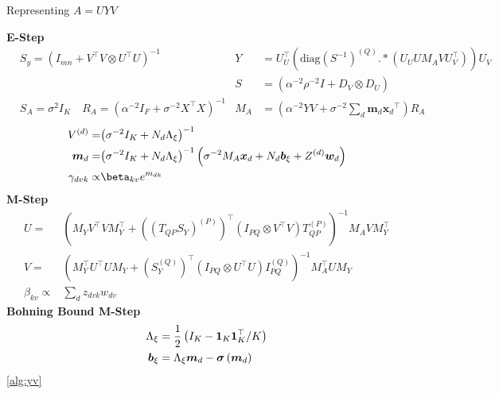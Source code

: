 \documentclass[10pt,fleqn]{article}
\newcommand \vecf[1] {
    \text{vec}\left(#1\right)
}
\newcommand \halve[1] {
	\frac{#1}{2}
}
\newcommand \half {
    \halve{1}
}
\newcommand \T { ^\top }
\newcommand \vv[1] { \bm #1 }
\newcommand \diag[1] { \text{diag} \left( {#1} \right) }
\newcommand \Axi { { \Lambda_{\xi} } }
\newcommand \bxi { { \vv{b}_{\xi} } }
\newcommand \xd      { { \vv x_d } }
\newcommand \beta[1]  { \mathcal{B}eta \left( {#1}, {#2} \right) }
\newcommand \inv[1] { {#1}^{-1} }
\newcommand \invb[1] { \inv{\left( #1 \right)} }
\newcommand \vt[2] { { #1^{(#2)} } }
\newcommand \mmy  { M_Y      }
\newcommand \md   { \vv{m}_d }
\begin{document}
%
%
%
%


\begin{algorithm}
\caption{Representing $A=UYV$}
\label{alg:uyv}
$\text{ }$\\
{\bf E-Step}
    \begin{align*}
        & S_y = \invb{I_{mn} + V\T V \otimes U\T U} \quad &
Y & = U_U^\top (\diag{\inv{S}}^{(Q)} .* (U_U U M_A V U_V^\top)) U_V \\
        & &
        S & = (\alpha^{-2}\rho^{-2} I + D_V \otimes D_U) \\
        & S_A = \sigma^2 I_K \quad R_A = \invb{\alpha^{-2} I_F + \sigma^{-2} X\T X} 
        & M_A & = \left(\alpha^{-2} YV + \sigma^{-2} \sum_d \md \xd\T\right)R_A
    \end{align*}
    \begin{align*}
         \Vd = & \invb{\sigma^{-2}I_K + N_d \Axi}\\
         \md = & \invb{\sigma^{-2}I_K + N_d \Axi} \left(\sigma^{-2} M_A \xd  + N_d \bxi + Z^{(d)}\vv{w}_d \right )\\
        \gamma_{dvk} \propto & \beta_{kv} e^{m_{dk}} 
\end{align*}
{\bf M-Step}
\begin{align*}
    U = & \invb{\mmy V\T V \mmy\T + \left( \vt{(T_{QP} S_Y)}{P} \right)\T (I_{PQ} \otimes V\T V)\vt{T_{QP}}{P}} M_A V \mmy\T \\
    V = & \invb{\mmy\T U\T U \mmy + \left(\vt{S_Y}{Q}\right)\T (I_{PQ} \otimes U\T U) \vt{I_{PQ}}{Q} } M_A \T U \mmy \\
    \beta_{kv} \propto & \sum_d z_{dvk} w_{dv} 
\end{align*}
{\bf Bohning Bound M-Step}
    \begin{align*}
        \Axi & = \half \left(I_K - \mathbf{1}_K\mathbf{1}_K\T / K  \right) \\
        \bxi & = \Axi \md  - \sigmoid{\md}
    \end{align*}
\ref{alg:yv}
\end{algorithm}
\end{document}
